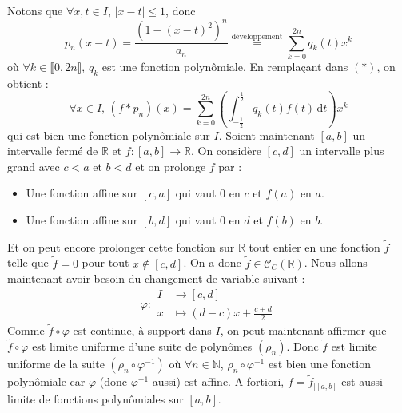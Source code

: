 \begin{demonstration}
		Notons que $\forall x, t \in I$, $|x-t| \leq 1$, donc
		\[ p_n(x-t) = \frac{(1 - (x-t)^2)^n}{a_n} \overset{\text{développement}}{=} \sum_{k=0}^{2n} q_k(t) x^k \]
		où $\forall k \in \llbracket 0, 2n \rrbracket$, $q_k$ est une fonction polynômiale. En remplaçant dans $(*)$, on obtient :
		\[ \forall x \in I, \, (f*p_n)(x) = \sum_{k=0}^{2n} \left( \int_{-\frac{1}{2}}^{\frac{1}{2}} q_k(t) f(t) \, \mathrm{d}t \right) x^k \]
		qui est bien une fonction polynômiale sur $I$.
		\newpar
		Soient maintenant $[a,b]$ un intervalle fermé de $\mathbb{R}$ et $f : [a, b] \rightarrow \mathbb{R}$. On considère $[c, d]$ un intervalle plus grand avec $c < a$ et $b < d$ et on prolonge $f$ par :
		\begin{itemize}
			\item Une fonction affine sur $[c, a]$ qui vaut $0$ en $c$ et $f(a)$ en $a$.
			\item Une fonction affine sur $[b, d]$ qui vaut $0$ en $d$ et $f(b)$ en $b$.
		\end{itemize}
		Et on peut encore prolonger cette fonction sur $\mathbb{R}$ tout entier en une fonction $\widetilde{f}$ telle que $\widetilde{f} = 0$ pour tout $x \notin [c, d]$. On a donc $\widetilde{f} \in \mathcal{C}_C(\mathbb{R})$. Nous allons maintenant avoir besoin du changement de variable suivant :
		\[ \varphi :
		\begin{array}{cl}
			I &\rightarrow [c, d] \\
			x &\mapsto (d-c)x + \frac{c+d}{2}
		\end{array}
		\]
		Comme $\widetilde{f} \circ \varphi$ est continue, à support dans $I$, on peut maintenant affirmer que $\widetilde{f} \circ \varphi$ est limite uniforme d'une suite de polynômes $(\rho_n)$. Donc $\widetilde{f}$ est limite uniforme de la suite $(\rho_n \circ \varphi^{-1})$ où $\forall n \in \mathbb{N}$, $\rho_n \circ \varphi^{-1}$ est bien une fonction polynômiale car $\varphi$ (donc $\varphi^{-1}$ aussi) est affine. A fortiori, $f = \widetilde{f}_{|[a,b]}$ est aussi limite de fonctions polynômiales sur $[a,b]$.
	\end{demonstration}

